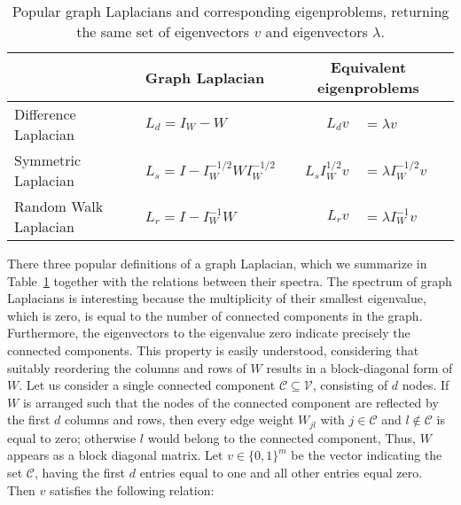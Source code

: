 \begin{table}%
	\centering
    \caption{Popular graph Laplacians and corresponding eigenproblems, returning the same set of eigenvectors $v$ and eigenvectors $\lambda$.}
	\begin{tabular}{llrl}\toprule
 & Graph Laplacian & \multicolumn{2}{c}{Equivalent eigenproblems}  \\ \midrule
Difference Laplacian  & $L_d=I_W-W$ & $L_d v$ &$ =\lambda v$\\
Symmetric  Laplacian & $L_s=I-I_W^{-1/2}WI_W^{-1/2}$ & $L_s I_W^{1/2}v$ & $=\lambda I_W^{-1/2}v$\\
Random Walk Laplacian & $L_r= I-I_W^{-1}W$ & $L_rv$ & $=\lambda I_W^{-1}v$\\
 \bottomrule
\end{tabular}
\label{tbl:laplacians}
\end{table}
There three popular definitions of a graph Laplacian, which we summarize in Table~\ref{tbl:laplacians} together with the relations between their spectra.   
The spectrum of graph Laplacians is interesting because the multiplicity of their smallest eigenvalue, which is zero, is equal to the number of connected components in the graph. Furthermore, the eigenvectors to the eigenvalue zero indicate precisely the connected components.
This property is easily understood, considering that suitably reordering the columns and rows of $W$ results in a block-diagonal form of $W$. Let us consider a single connected component $\mathcal{C}\subseteq\mathcal{V}$, consisting of $d$ nodes. If $W$ is arranged such that the nodes of the connected component are reflected by the first $d$ columns and rows, then every edge weight $W_{jl}$ with $j\in\mathcal{C}$ and $l\notin\mathcal{C}$ is equal to zero; otherwise $l$ would belong to the connected component, Thus, $W$ appears as a block diagonal matrix. Let $v\in\{0,1\}^m$ be the vector indicating the set $\mathcal{C}$, having the first $d$ entries equal to one and all other entries equal zero. Then $v$ satisfies the following relation:
